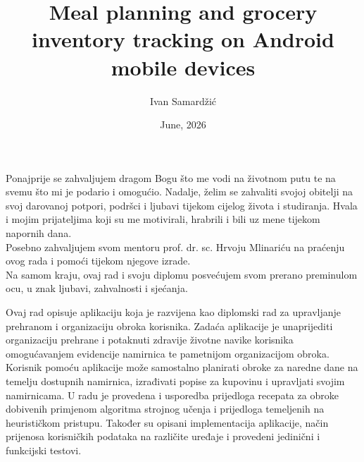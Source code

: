 \documentclass[diplomskirad]{fer}
\title{Meal planning and grocery inventory tracking on Android mobile devices}
\author{Ivan Samardžić}
\date{June, 2026}
\begin{document}
\maketitle






\begin{zahvale}
  Ponajprije se zahvaljujem dragom Bogu što me vodi na životnom putu te na svemu što mi je podario i omogućio. Nadalje, želim se zahvaliti svojoj obitelji na svoj darovanoj potpori, podršci i ljubavi tijekom cijelog života i studiranja. Hvala i mojim prijateljima koji su me motivirali, hrabrili i bili uz mene tijekom napornih dana. 
  \\
  Posebno zahvaljujem svom mentoru prof. dr. sc. Hrvoju Mlinariću na praćenju ovog rada i pomoći tijekom njegove izrade.
  \\
  Na samom kraju, ovaj rad i svoju diplomu posvećujem svom prerano preminulom ocu, u znak ljubavi, zahvalnosti i sjećanja.
\end{zahvale}


\mainmatter



\begin{sazetak}
Ovaj rad opisuje aplikaciju koja je razvijena kao diplomski rad za upravljanje prehranom i organizaciju obroka korisnika. Zadaća aplikacije je unaprijediti organizaciju prehrane i potaknuti zdravije životne navike korisnika omogućavanjem evidencije namirnica te pametnijom organizacijom obroka. Korisnik pomoću aplikacije može samostalno planirati obroke za naredne dane na temelju dostupnih namirnica, izrađivati popise za kupovinu i upravljati svojim namirnicama. U radu je provedena i usporedba prijedloga recepata za obroke dobivenih primjenom algoritma strojnog učenja i prijedloga temeljenih na heurističkom pristupu. Također su opisani implementacija aplikacije, način prijenosa korisničkih podataka na različite uređaje i provedeni jedinični i funkcijski testovi.

\end{sazetak}
\end{document}
